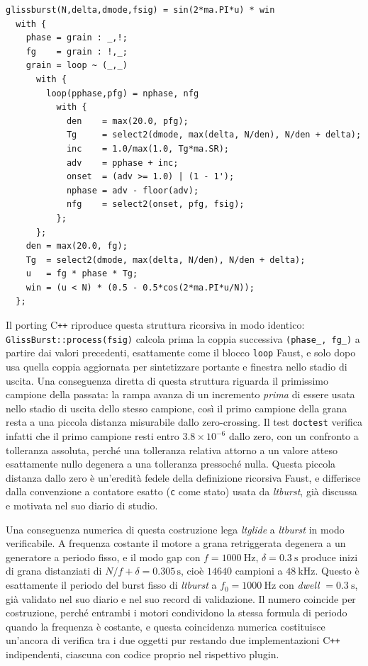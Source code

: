 \documentclass[11pt,a4paper]{article}
\begin{document}
\begin{lstlisting}
glissburst(N,delta,dmode,fsig) = sin(2*ma.PI*u) * win
  with {
    phase = grain : _,!;
    fg    = grain : !,_;
    grain = loop ~ (_,_)
      with {
        loop(pphase,pfg) = nphase, nfg
          with {
            den    = max(20.0, pfg);
            Tg     = select2(dmode, max(delta, N/den), N/den + delta);
            inc    = 1.0/max(1.0, Tg*ma.SR);
            adv    = pphase + inc;
            onset  = (adv >= 1.0) | (1 - 1');
            nphase = adv - floor(adv);
            nfg    = select2(onset, pfg, fsig);
          };
      };
    den = max(20.0, fg);
    Tg  = select2(dmode, max(delta, N/den), N/den + delta);
    u   = fg * phase * Tg;
    win = (u < N) * (0.5 - 0.5*cos(2*ma.PI*u/N));
  };
\end{lstlisting}

Il porting C\texttt{++} riproduce questa struttura ricorsiva in modo identico: \texttt{GlissBurst::process(fsig)} calcola prima la coppia successiva \texttt{(phase\_, fg\_)} a partire dai valori precedenti, esattamente come il blocco \texttt{loop} Faust, e solo dopo usa quella coppia aggiornata per sintetizzare portante e finestra nello stadio di uscita.
Una conseguenza diretta di questa struttura riguarda il primissimo campione della passata: la rampa avanza di un incremento \emph{prima} di essere usata nello stadio di uscita dello stesso campione, cos\`i il primo campione della grana resta a una piccola distanza misurabile dallo zero-crossing.
Il test \texttt{doctest} verifica infatti che il primo campione resti entro $3.8 \times 10^{-6}$ dallo zero, con un confronto a tolleranza assoluta, perch\'e una tolleranza relativa attorno a un valore atteso esattamente nullo degenera a una tolleranza pressoch\'e nulla.
Questa piccola distanza dallo zero \`e un'eredit\`a fedele della definizione ricorsiva Faust, e differisce dalla convenzione a contatore esatto (\texttt{c} come stato) usata da \emph{ltburst}, gi\`a discussa e motivata nel suo diario di studio.

Una conseguenza numerica di questa costruzione lega \emph{ltglide} a \emph{ltburst} in modo verificabile.
A frequenza costante il motore a grana retriggerata degenera a un generatore a periodo fisso, e il modo gap con $f=\SI{1000}{\hertz}$, $\delta=\SI{0.3}{\second}$ produce inizi di grana distanziati di $N/f+\delta = 0.305\,\mathrm{s}$, cio\`e $14640$ campioni a $\SI{48}{\kilo\hertz}$.
Questo \`e esattamente il periodo del burst fisso di \emph{ltburst} a $f_0=\SI{1000}{\hertz}$ con \emph{dwell} $=\SI{0.3}{\second}$, gi\`a validato nel suo diario e nel suo record di validazione.
Il numero coincide per costruzione, perch\'e entrambi i motori condividono la stessa formula di periodo quando la frequenza \`e costante, e questa coincidenza numerica costituisce un'ancora di verifica tra i due oggetti pur restando due implementazioni C\texttt{++} indipendenti, ciascuna con codice proprio nel rispettivo plugin.
\end{document}
